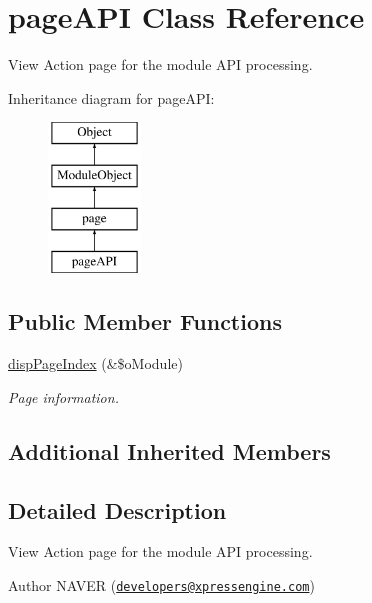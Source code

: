 \hypertarget{classpageAPI}{\section{page\-A\-P\-I Class Reference}
\label{classpageAPI}
}


View Action page for the module A\-P\-I processing.  


Inheritance diagram for page\-A\-P\-I\-:\begin{figure}[H]
\begin{center}
\leavevmode
\includegraphics[height=4.000000cm]{classpageAPI}
\end{center}
\end{figure}
\subsection*{Public Member Functions}
\begin{DoxyCompactItemize}
\item 
\hyperlink{classpageAPI_a75a866f5715bbd74bdd977676027cd20}{disp\-Page\-Index} (\&\$o\-Module)
\begin{DoxyCompactList}\small\item\em Page information. \end{DoxyCompactList}\end{DoxyCompactItemize}
\subsection*{Additional Inherited Members}


\subsection{Detailed Description}
View Action page for the module A\-P\-I processing. 

\begin{DoxyAuthor}{Author}
N\-A\-V\-E\-R (\href{mailto:developers@xpressengine.com}{\tt developers@xpressengine.\-com}) 
\end{DoxyAuthor}


